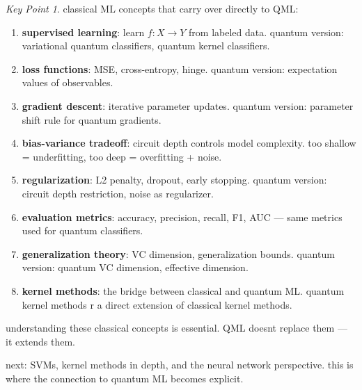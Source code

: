 \documentclass[11pt,a4paper]{article}
\theoremstyle{definition}
\theoremstyle{remark}
\newtheorem*{keypoint}{Key Point}
\begin{document}
\begin{keypoint}
classical ML concepts that carry over directly to QML:
\begin{enumerate}
    \item \textbf{supervised learning}: learn $f: X \to Y$ from labeled data. quantum version: variational quantum classifiers, quantum kernel classifiers.
    \item \textbf{loss functions}: MSE, cross-entropy, hinge. quantum version: expectation values of observables.
    \item \textbf{gradient descent}: iterative parameter updates. quantum version: parameter shift rule for quantum gradients.
    \item \textbf{bias-variance tradeoff}: circuit depth controls model complexity. too shallow = underfitting, too deep = overfitting + noise.
    \item \textbf{regularization}: L2 penalty, dropout, early stopping. quantum version: circuit depth restriction, noise as regularizer.
    \item \textbf{evaluation metrics}: accuracy, precision, recall, F1, AUC --- same metrics used for quantum classifiers.
    \item \textbf{generalization theory}: VC dimension, generalization bounds. quantum version: quantum VC dimension, effective dimension.
    \item \textbf{kernel methods}: the bridge between classical and quantum ML. quantum kernel methods r a direct extension of classical kernel methods.
\end{enumerate}
understanding these classical concepts is essential. QML doesnt replace them --- it extends them.
\end{keypoint}

next: SVMs, kernel methods in depth, and the neural network perspective. this is where the connection to quantum ML becomes explicit.
\end{document}
